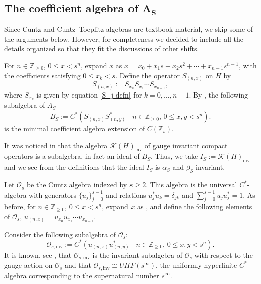 \documentclass[pdftex]{sigma}
\newcommand{\Z}{{\mathbb Z}}
\numberwithin{equation}{section}
\begin{document}
\subsection[The coefficient algebra of A\_S]{The coefficient algebra of $\boldsymbol{A_S}$}
Since Cuntz and Cuntz--Toeplitz algebras are textbook material, we skip some of the arguments below. However, for completeness we decided to include all the details organized so that they fit the discussions of other shifts.

For $n\in \Z_{\ge0}$, $0 \le x < s^n$, expand $x$ as
$x = x_0 + x_1 s + x_2 s^2 + \cdots + x_{n-1} s^{n-1}$,
with the coefficients satisfying $0\leq x_k<s$.
Define the operator $S_{(n,x)}$ on $H$ by
\[
S_{(n,x)} := S_{x_0}S_{x_1}\cdots S_{x_{n-1}},
\]
where $S_{x_k}$ is given by equation \eqref{S_j defn} for $k=0,\dots,n-1$.
By \cite[Proposition 6.5]{HKMP3}, the following subalgebra of $A_S$
\begin{equation*}
B_S:= C^*(S_{(n,x)}S_{(n,y)}^*\mid n\in \Z_{\ge0},\, 0\le x,y<s^n).
\end{equation*}
 is the minimal coefficient algebra extension of $C(\Z_s)$.

It was noticed in \cite[Section 6.6]{HKMP3} that the algebra $\mathcal{K}(H)_{\mathrm{inv}}$ of gauge invariant compact operators is a subalgebra, in fact an ideal of $B_S$. Thus, we take
$I_S:=\mathcal{K}(H)_{\mathrm{inv}}$
and we see from the definitions that the ideal $I_S$ is $\alpha_S$ and $\beta_S$ invariant.

 Let $\mathcal{O}_s$ be the Cuntz algebra indexed by $s\ge2$. This algebra is the universal $C^*$-algebra with generators $\{u_j\}_{j=0}^{s-1}$ and relations
$u_j^*u_k=\delta_{jk}$ and $ \sum_{j=0}^{s-1}u_ju_j^*=1$.
As before, for $n\in \Z_{\ge0}$, $0 \le x < s^n$, expand $x$ as
,
and define the following elements of $\mathcal{O}_s$,
$
u_{(n,x)} = u_{x_0}u_{x_1}\cdots u_{x_{n-1}}$.

Consider the following subalgebra of $\mathcal{O}_s$:
\begin{equation*}
\mathcal{O}_{s,\mathrm{inv}}:= C^*(u_{(n,x)}u_{(n,y)}^*\mid n\in \Z_{\ge0},\, 0\le x,y<s^n).
\end{equation*}
It is known, see \cite{Cu3}, that $\mathcal{O}_{s,\mathrm{inv}}$ is the invariant subalgebra of $\mathcal{O}_s$ with respect to the gauge action on $\mathcal{O}_s$ and that
$\mathcal{O}_{s,\mathrm{inv}}\cong UHF(s^\infty)$,
the uniformly hyperfinite $C^*$-algebra corresponding to the supernatural number $s^\infty$.
\end{document}

